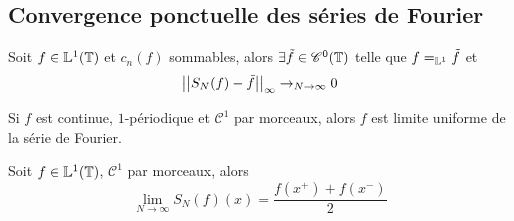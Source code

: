 \subsection{Convergence ponctuelle des séries de Fourier}

\begin{prop}
	Soit $f \in \mathbb{L}^1(\mathbb{T})$ et $c_n(f)$ sommables, alors $\exists \tilde f \in \mathscr {C}^0(\mathbb{T})$ telle que $f =_{\mathbb{L}^1} \tilde f$  et
	$$ \left|\left|S_N(f) - \tilde f\right|\right|_{\infty} \to_{N\to \infty} 0$$
\end{prop}

\begin{prop} %
	Si $f$ est continue, $1$-périodique et $\mathscr {C}^1$ par morceaux, alors $f$ est limite uniforme de la série de Fourier.
\end{prop}


\begin{theorem}[Dirichlet]
	Soit $f \in \mathbb{L}^1(\mathbb{T})$, $\mathscr {C}^1$ par morceaux, alors
	$$\lim_{N\to \infty} S_N(f)(x) = \frac {f(x^+) + f(x^-)}{2}$$
\end{theorem}
